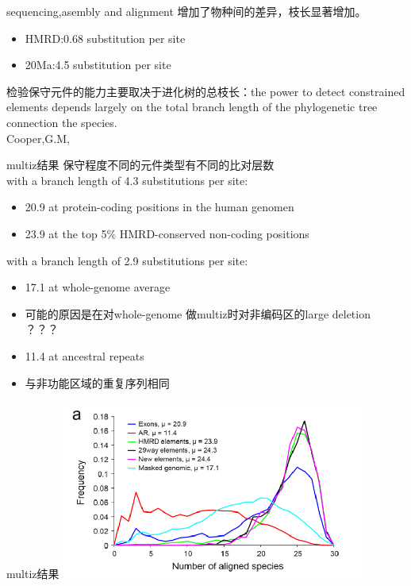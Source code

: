 \documentclass{beamer}
\begin{document}
\begin{frame}{sequencing,asembly and alignment}
增加了物种间的差异，枝长显著增加。
\begin{itemize}
\item HMRD:0.68 substitution per site
\item 20Ma:4.5  substitution per site
\end{itemize}
检验保守元件的能力主要取决于进化树的总枝长：the power to detect constrained elements depends largely on the total branch length of the phylogenetic tree connection the species.\\
Cooper,G.M, {\color{red}{A quantitive estimates of sequence divergence for comparative analysis of mammaliang genomes}}
\end{frame}

\begin{frame}{multiz结果}
保守程度不同的元件类型有不同的比对层数\\
with a branch length of 4.3 substitutions per site:
\begin{itemize}
\item  20.9 at protein-coding positions in the human genomen 
\item  23.9 at the top 5\% HMRD-conserved non-coding positions
\end{itemize}
with a branch length of 2.9 substitutions per site:
\begin{itemize}
\item 17.1 at whole-genome average 
\item 可能的原因是在对whole-genome 做multiz时对非编码区的large deletion ？？？{\color{red}{这里需要看补充材料}}
\end{itemize}
\begin{itemize}
\item 11.4 at ancestral repeats
\item 与非功能区域的重复序列相同
\end{itemize}
\end{frame}

\begin{frame}{multiz结果}
\includegraphics[width=10cm]{../numberofalignment.png}
\end{frame}
\end{document}
